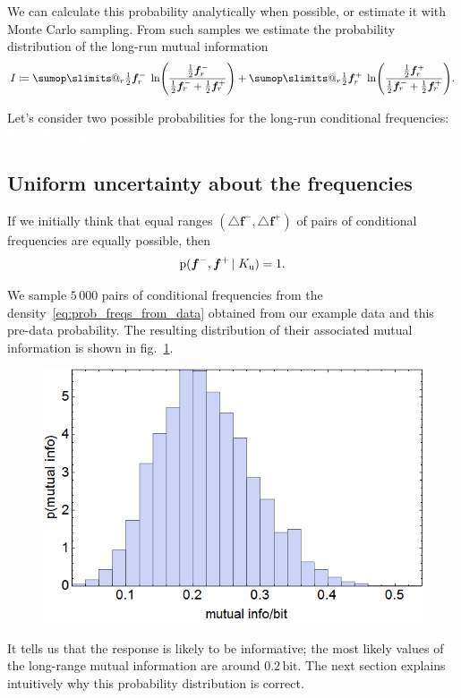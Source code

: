 \documentclass[\ifafour a4paper,12pt,\else a5paper,10pt,\fi%
onecolumn,oneside,article,%
british%
]{memoir}
\makeatletter
\theoremstyle{remark}
\theoremstyle{innote}
\def\sum{\DOTSI\sumop\slimits@}
\newcommand*{\incr}{\triangle}%
\newcommand*{\defd}{\coloneqq}
\newcommand*{\pf}{\mathrm{p}}%
\renewcommand*{\|}{\nonscript\,\vert\nonscript\;\mathopen{}}
\newcommand*{\fig}{fig.}%
\newcommand*{\yfvm}{\bm{f}^{-}}
\newcommand*{\yfvp}{\bm{f}^{+}}
\newcommand*{\yIu}{K_{\text{u}}}
\makeatother
\begin{document}
We can calculate this probability analytically when possible, or estimate
it with Monte Carlo sampling. From such samples we estimate the probability
distribution of the long-run mutual information
\begin{equation}
  \label{eq:mutual_info}
  I \defd \sum_r \tfrac{1}{2}\yfvm_r\;
  \ln\Biggl(\frac{\frac{1}{2}\yfvm_r}{
    \frac{1}{2}\yfvm_r + \frac{1}{2}\yfvp_r}
  \Biggr) +
  \sum_r \tfrac{1}{2}\yfvp_r\;
  \ln\Biggl(\frac{\frac{1}{2}\yfvp_r}{
    \frac{1}{2}\yfvm_r + \frac{1}{2}\yfvp_r}
  \Biggr).
\end{equation}

Let's consider two possible probabilities for the long-run conditional
frequencies: \textcolor{white}{If you find this you can claim a postcard from me.}


\subsection{Uniform uncertainty about the frequencies}
\label{sec:credib_unif}

If we initially think that equal ranges $(\incr\yfvm, \incr\yfvp)$ of pairs
of conditional frequencies are equally possible, then
\begin{equation}
  \label{eq:credib_unif}
    \pf(\yfvm, \yfvp \| \yIu) = 1.
\end{equation}

We sample $5\,000$ pairs of conditional frequencies from the
density~\eqref{eq:prob_freqs_from_data} obtained from our example data and
this pre-data probability. The resulting distribution of their associated
mutual information is shown in \fig~\ref{fig:mutual_info_histo_unif}.
\begin{figure}[h!]
\centering\includegraphics[width=0.5\linewidth]{A_mutualinfo_hist.png}\\
\caption{}\label{fig:mutual_info_histo_unif}
\end{figure}%
It tells us that the response is likely to be informative; the most likely
values of the long-range mutual information are around $0.2\,\textrm{bit}$.
The next section explains intuitively why this probability distribution is
correct.
\end{document}
